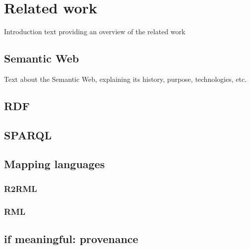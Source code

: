 
\chapter{Related work}

Introduction text providing an overview of the related work

\section{Semantic Web}
Text about the Semantic Web, explaining its history, purpose, technologies, etc.

\section{RDF}

\section{SPARQL}

\section{Mapping languages}

\subsection{R2RML}
\subsection{RML}

\section{if meaningful: provenance}
